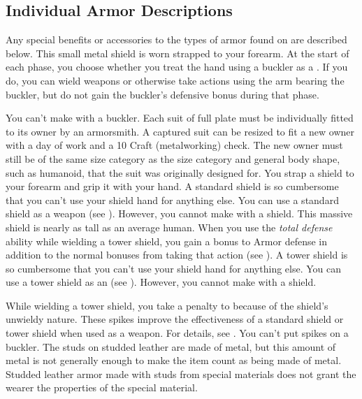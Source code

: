   \subsection{Individual Armor Descriptions}
    Any special benefits or accessories to the types of armor found on  are described below.
     This small metal shield is worn strapped to your forearm.
    At the start of each phase, you choose whether you treat the hand using a buckler as a .
    If you do, you can wield weapons or otherwise take actions using the arm bearing the buckler, but do not gain the buckler's defensive bonus during that phase.
    \par You can't make  with a buckler.
     Each suit of full plate must be individually fitted to its owner by an armorsmith.
    A captured suit can be resized to fit a new owner with a day of work and a  10 Craft (metalworking) check.
    The new owner must still be of the same size category as the size category and general body shape, such as humanoid, that the suit was originally designed for.
     You strap a shield to your forearm and grip it with your hand.
    A standard shield is so cumbersome that you can't use your shield hand for anything else.
    You can use a standard shield as a weapon (see ).
    However, you cannot make  with a shield.
     This massive shield is nearly as tall as an average human.
    When you use the \textit{total defense} ability while wielding a tower shield, you gain a  bonus to Armor defense in addition to the normal bonuses from taking that action (see ).
    A tower shield is so cumbersome that you can't use your shield hand for anything else.
    You can use a tower shield as an  (see ).
    However, you cannot make  with a shield.

    While wielding a tower shield, you take a  penalty to  because of the shield's unwieldy nature.
     These spikes improve the effectiveness of a standard shield or tower shield when used as a weapon.
    For details, see .
    You can't put spikes on a buckler.
     The studs on studded leather are made of metal, but this amount of metal is not generally enough to make the item count as being made of metal.
    Studded leather armor made with studs from special materials does not grant the wearer the properties of the special material.

